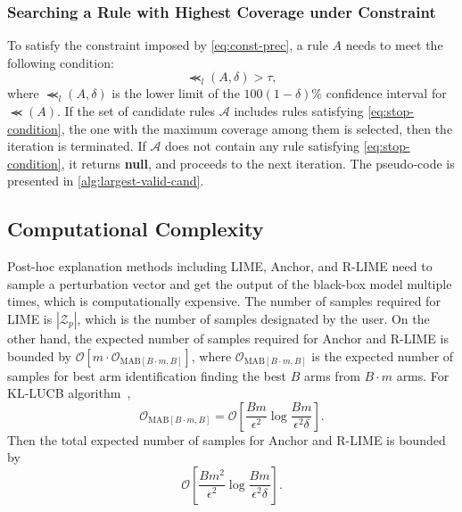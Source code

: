 \documentclass[runningheads]{llncs}
\begin{document}
{\subsubsection{Searching a Rule with Highest Coverage under Constraint}
To satisfy the constraint imposed by \cref{eq:const-prec},
a rule $A$ needs to meet the following condition:
\begin{equation}
  \Prec_{l}(A,\delta)>\tau,\label{eq:stop-condition}
\end{equation}
where $\Prec_{l}(A,\delta)$ is the lower limit of
the $100(1-\delta)$\% confidence interval for $\Prec(A)$.
If the set of candidate rules $\mathcal{A}$
includes rules satisfying \cref{eq:stop-condition},
the one with the maximum coverage among them is selected,
then the iteration is terminated.
If $\mathcal{A}$ does not contain any rule satisfying \cref{eq:stop-condition},
it returns \textbf{null},
and proceeds to the next iteration.
The pseudo-code is presented in \cref{alg:largest-valid-cand}.


\subsection{Computational Complexity}
Post-hoc explanation methods including LIME, Anchor, and R-LIME
need to sample a perturbation vector
and get the output of the black-box model multiple times,
which is computationally expensive.
The number of samples required for LIME is $|\mathcal{Z}_p|$,
which is the number of samples designated by the user.
On the other hand,
the expected number of samples required for Anchor and R-LIME is bounded by
$\mathcal{O}[m\cdot\mathcal{O}_{\mathrm{MAB}[B\cdot m,B]}]$,
where $\mathcal{O}_{\mathrm{MAB}[B\cdot m,B]}$
is the expected number of samples
for best arm identification finding the best $B$ arms from $B\cdot m$ arms.
For KL-LUCB algorithm~\cite{kaufmann2013information},
\begin{equation}
  \mathcal{O}_{\mathrm{MAB}[B\cdot m,B]}=
  \mathcal{O}\left[\frac{Bm}{\epsilon^2}\log\frac{Bm}{\epsilon^2\delta}\right].
\end{equation}
Then the total expected number of samples for Anchor and R-LIME is bounded by
\begin{equation}
  \mathcal{O}\left[\frac{Bm^2}{\epsilon^2}\log\frac{Bm}{\epsilon^2\delta}\right].
\end{equation}

}
\end{document}
